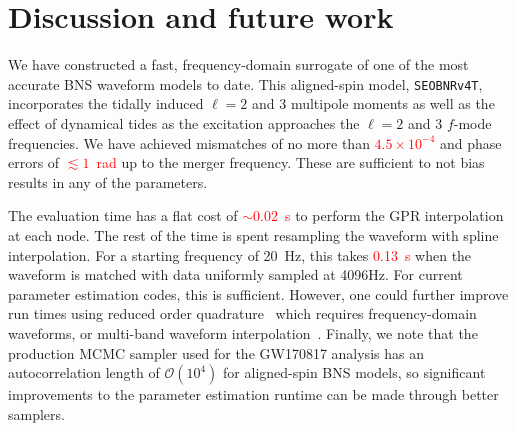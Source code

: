 \documentclass[prd,aps,letter,twocolumn,floatfix,notitlepage,nofootinbib]{revtex4-1}
\newcommand{\red}[1]{\textcolor{red}{#1}}
\begin{document}
%
%

\section{Discussion and future work}
\label{sec:discussion}

We have constructed a fast, frequency-domain surrogate of one of the most accurate BNS waveform models to date. This aligned-spin model, \texttt{SEOBNRv4T}, incorporates the tidally induced $\ell=2$ and 3 multipole moments as well as the effect of dynamical tides as the excitation approaches the $\ell=2$ and 3 $f$-mode frequencies. We have achieved mismatches of no more than \red{$4.5 \times 10^{-4}$} and phase errors of \red{$\lesssim 1$~rad} up to the merger frequency. These are sufficient to not bias results in any of the parameters.

The evaluation time has a flat cost of \red{$\sim 0.02$~s} to perform the GPR interpolation at each node. The rest of the time is spent resampling the waveform with spline interpolation. For a starting frequency of 20~Hz, this takes \red{0.13~s} when the waveform is matched with data uniformly sampled at 4096Hz. For current parameter estimation codes, this is sufficient. However, one could further improve run times using reduced order quadrature~\cite{Antil2013, CanizaresFieldGair2013, CanizaresFieldGair2015, Smith:2016qas} which requires frequency-domain waveforms, or multi-band waveform interpolation~\cite{VinciguerraVeitchMandel2017}. Finally, we note that the production MCMC sampler used for the GW170817 analysis has an autocorrelation length of $\mathcal{O}(10^4)$ for aligned-spin BNS models, so significant improvements to the parameter estimation runtime can be made through better samplers. 
\end{document}
